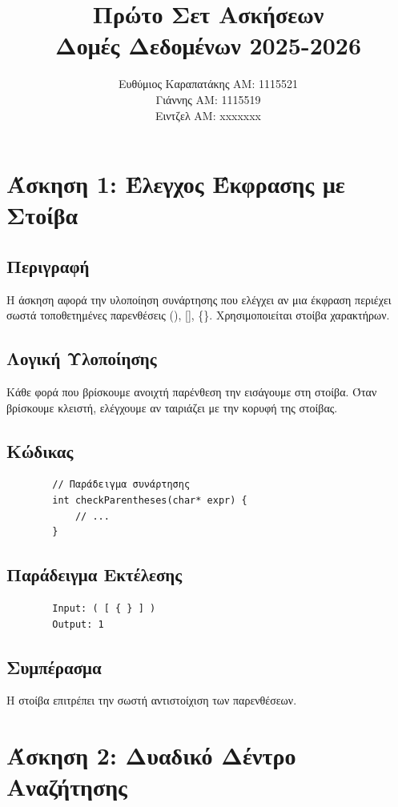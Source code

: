 \documentclass[a4paper,12pt]{article}
\title{Πρώτο Σετ Ασκήσεων \\ Δομές Δεδομένων 2025-2026}
\author{
	Ευθύμιος Καραπατάκης ΑΜ: 1115521\\
	Γιάννης ΑΜ: 1115519\\
	Ειντζελ ΑΜ: xxxxxxx
}
\begin{document}
	
	\maketitle
	\tableofcontents
	\newpage
	
	\section{Άσκηση 1: Έλεγχος Έκφρασης με Στοίβα}
	
	\subsection{Περιγραφή}
	Η άσκηση αφορά την υλοποίηση συνάρτησης που ελέγχει αν μια έκφραση περιέχει σωστά τοποθετημένες παρενθέσεις (), [], \{\}. Χρησιμοποιείται στοίβα χαρακτήρων.
	
	\subsection{Λογική Υλοποίησης}
	Κάθε φορά που βρίσκουμε ανοιχτή παρένθεση την εισάγουμε στη στοίβα. Όταν βρίσκουμε κλειστή, ελέγχουμε αν ταιριάζει με την κορυφή της στοίβας.
	
	\subsection{Κώδικας}
	\begin{lstlisting}
		// Παράδειγμα συνάρτησης
		int checkParentheses(char* expr) {
			// ...
		}
	\end{lstlisting}
	
	\subsection{Παράδειγμα Εκτέλεσης}
	\begin{verbatim}
		Input: ( [ { } ] )
		Output: 1
	\end{verbatim}
	
	\subsection{Συμπέρασμα}
	Η στοίβα επιτρέπει την σωστή αντιστοίχιση των παρενθέσεων.
	\newpage
	\section{Άσκηση 2: Δυαδικό Δέντρο Αναζήτησης}
	
\end{document}
